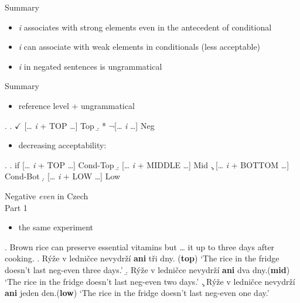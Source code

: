 \documentclass[ignorenonframetext,]{beamer}
\providecommand{\tightlist}{%
  \setlength{\itemsep}{0pt}\setlength{\parskip}{0pt}}
\newcommand{\cond}[1]{\textbf{#1}}
\begin{document}
\begin{frame}{Summary}

\begin{itemize}
\tightlist
\item
  \emph{i} associates with strong elements even in the antecedent of
  conditional
\item
  \emph{i} can associate with weak elements in conditionals (less
  acceptable)
\item
  \emph{i} in negated sentences is ungrammatical
\end{itemize}

\end{frame}

\begin{frame}{Summary}

\begin{itemize}
\tightlist
\item
  reference level + ungrammatical
\end{itemize}

\ex. \a. \(\checkmark\) {[}\ldots{} \emph{i} + TOP \ldots{}{]}
\hfill Top \b. * \(\neg\){[}\ldots{} \emph{i} \ldots{}{]} \hfill Neg

\begin{itemize}
\tightlist
\item
  decreasing acceptability:
\end{itemize}

\ex. \a. if {[}\ldots{} \emph{i} + TOP \ldots{}{]} \hfill Cond-Top \b.
{[}\ldots{} \emph{i} + MIDDLE \ldots{}{]} \hfill Mid \c. {[}\ldots{}
\emph{i} + BOTTOM \ldots{}{]} \hfill Cond-Bot \d. {[}\ldots{} \emph{i} +
LOW \ldots{}{]} \hfill Low

\end{frame}


\begin{frame}{Negative \emph{even} in Czech\\ Part 1}

\begin{itemize}
\tightlist
\item
  the same experiment 
\end{itemize}

\ex. Brown rice can preserve essential vitamins but \ldots{} it up to
three days after cooking.\label{ex-2} \a. Rýže v ledničce nevydrží
\textbf{ani} tři dny. \label{ex-1-a}\hfill (\cond{top})\newline
`The rice in the fridge doesn't last neg-even three days.' \b. Rýže v
ledničce nevydrží \textbf{ani} dva
dny.\label{ex-1-b}\hfill (\cond{mid})\newline
`The rice in the fridge doesn't last neg-even two days.' \c. Rýže v
ledničce nevydrží \textbf{ani} jeden
den.\hfill (\cond{low})\label{ex-1-c}\newline
`The rice in the fridge doesn't last neg-even one day.'

\end{frame}
\end{document}
